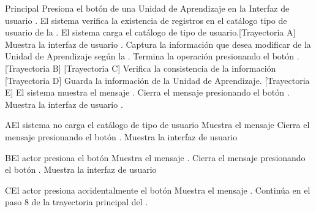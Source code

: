 \begin{UCtrayectoria}{Principal}
    \UCpaso[\UCactor] Presiona el botón  de una Unidad de Aprendizaje en la Interfaz de usuario  .
    \UCpaso El sistema verifica la existencia de registros en el catálogo tipo de usuario de la  .
   \UCpaso El sistema carga el catálogo de tipo de usuario.[Trayectoria A]
    \UCpaso Muestra la interfaz de usuario .
 	\UCpaso[\UCactor] Captura la información que desea modificar de la Unidad de Aprendizaje según la .
 	\UCpaso[\UCactor] Termina la operación presionando el botón . [Trayectoria B] [Trayectoria C]
 	\UCpaso Verifica la consistencia de la información [Trayectoria D]
 	\UCpaso Guarda la información de la Unidad de Aprendizaje. [Trayectoria E]
 	\UCpaso El sistema muestra el mensaje .
 	\UCpaso[\UCactor] Cierra el mensaje presionando el botón .
 	\UCpaso Muestra la interfaz de usuario .
\end{UCtrayectoria}
\begin{UCtrayectoriaA}{A}{El sistema no carga el catálogo de tipo de usuario}
	\UCpaso Muestra el mensaje 
	\UCpaso[\UCactor] Cierra el mensaje presionando el botón .
	 \UCpaso Muestra la interfaz de usuario 
\end{UCtrayectoriaA}
\begin{UCtrayectoriaA}{B}{El actor presiona el botón }
	\UCpaso Muestra el mensaje .
	\UCpaso[\UCactor] Cierra el mensaje presionando el botón .
	\UCpaso Muestra la interfaz de usuario 
\end{UCtrayectoriaA}
\begin{UCtrayectoriaA}{C}{El actor presiona accidentalmente el botón }
	\UCpaso Muestra el mensaje .
    \UCpaso Continúa en el paso 8 de la trayectoria principal del .
\end{UCtrayectoriaA}
